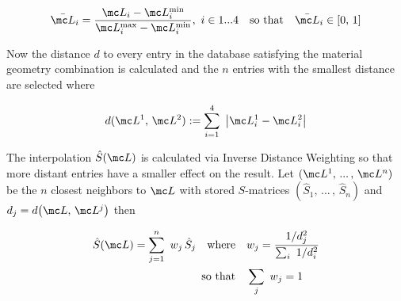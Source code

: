 \begin{equation}
    \bar{\mc L}_i = \frac{\mc L_i - \mc L_i^\s{min}}{\mc L_i^\s{max} - \mc L_i^\s{min}}
    , \  i \in 1 ... 4
    \qq{so that} \bar{\mc L}_i \in [0, \, 1]
\end{equation}

\noindent
Now the distance $d$ to every entry in the database satisfying the material geometry combination is calculated and the $n$ entries with the smallest distance are selected where

\begin{equation}
    d(\mc L^1, \, \mc L^2) := \sum_{i=1}^4 \ \qty|\mc L^1_i - \mc L^2_i|
\end{equation}

\noindent
The interpolation $\hat{S}(\mc L)$ is calculated via Inverse Distance Weighting \cite{Shepard1968} so that more distant entries have a smaller effect on the result. Let
$(\mc L^1, \, ... \, , \, \mc L^n)$ be the $n$ closest neighbors to $\mc L$ with stored $S$-matrices
$(\hat{S}_1, \, ... \, , \, \hat{S}_n)$
and
$d_j = d\qty(\mc L ,\, \mc L^j)$
then

\begin{equation}
\begin{aligned}
    \hat{S}(\mc L) = \sum_{j=1}^n \ w_j \, \hat{S}_j
    \qq{where}& w_j = \frac{1 / d_j^2}{\sum_i \ 1 / d^2_i} \\
    \qq*{so that} &\sum_j \ w_j = 1
\end{aligned}
\end{equation}
